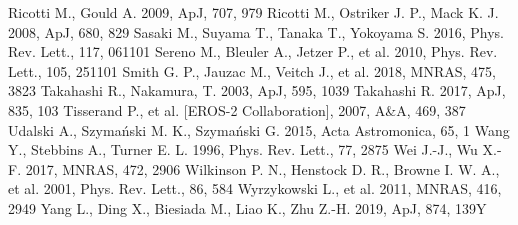 \documentclass[useAMS,usenatbib,usegraphicx]{mn2e}
\begin{document}
\begin{thebibliography}{}
 Ricotti M., Gould A. 2009, ApJ, 707, 979
 Ricotti M., Ostriker J. P., Mack K. J. 2008, ApJ, 680, 829
 Sasaki M., Suyama T., Tanaka T., Yokoyama S. 2016, Phys. Rev. Lett., 117, 061101
 Sereno M., Bleuler A., Jetzer P.,  et al. 2010, Phys. Rev. Lett., 105, 251101
 Smith G. P., Jauzac M., Veitch J.,  et al. 2018, MNRAS, 475, 3823
 Takahashi R., Nakamura, T. 2003, ApJ, 595, 1039
 Takahashi R. 2017, ApJ, 835, 103
 Tisserand P., et al. [EROS-2 Collaboration], 2007, A\&A, 469, 387
 Udalski A., Szyma\'{n}ski M. K., Szyma\'{n}ski G. 2015, Acta Astromonica, 65, 1
 Wang Y., Stebbins A., Turner E. L. 1996, Phys. Rev. Lett., 77, 2875
 Wei J.-J., Wu X.-F. 2017, MNRAS, 472, 2906
 Wilkinson P. N., Henstock D. R., Browne I. W. A.,  et al. 2001, Phys. Rev. Lett., 86, 584
  Wyrzykowski L., et al. 2011, MNRAS, 416, 2949
Yang L., Ding X., Biesiada M., Liao K., Zhu Z.-H. 2019, ApJ, 874, 139Y


\end{thebibliography}

\label{lastpage}
\end{document}
